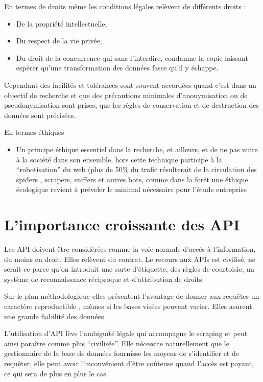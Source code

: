 \documentclass[
  letterpaper,
  DIV=11,
  numbers=noendperiod]{scrreprt}
\providecommand{\tightlist}{%
  \setlength{\itemsep}{0pt}\setlength{\parskip}{0pt}}\usepackage{longtable,booktabs,array}
\begin{document}
En termes de droits même les conditions légales relèvent de différents
droits :

\begin{itemize}
\tightlist
\item
  De la propriété intellectuelle,
\item
  Du respect de la vie privée,
\item
  Du droit de la concurrence qui sans l'interdire, condamne la copie
  laissant espérer qu'une transformation des données fasse qu'il y
  échappe.
\end{itemize}

Cependant des facilités et tolérances sont souvent accordées quand c'est
dans un objectif de recherche et que des précautions minimales
d'anonymisation ou de pseudonymisation sont prises, que les règles de
conservation et de destruction des données sont précisées.

En termes éthiques

\begin{itemize}
\tightlist
\item
  Un principe éthique essentiel dans la recherche, et ailleurs, et de ne
  pas nuire à la société dans son ensemble, hors cette technique
  participe à la ``robotisation'' du web (plus de 50\% du trafic
  résulterait de la circulation des spiders , scrapers, sniffers et
  autres bots, comme dans la forêt une éthique écologique revient à
  préveler le minimal nécessaire pour l'étude entreprise
\end{itemize}

\section{L'importance croissante des
API}\label{limportance-croissante-des-api}

Les API doivent être considérées comme la voie normale d'accès à
l'information, du moins en droit. Elles relèvent du contrat. Le recours
aux APIs est civilisé, ne serait-ce parce qu'on introduit une sorte
d'étiquette, des règles de courtoisie, un système de reconnaissance
réciproque et d'attribution de droits.

Sur le plan méthodologique elles présentent l'avantage de donner aux
requêtes un caractère reproductible , mêmes si les bases visées peuvent
varier. Elles asurent une grande fiabilité des données.

L'utilisation d'API lève l'ambiguïté légale qui accompagne le scraping
et peut ainsi paraître comme plus ``civilisée''. Elle nécessite
naturellement que le gestionnaire de la base de données fournisse les
moyens de s'identifier et de requêter, elle peut avoir l'inconvénient
d'être coûteuse quand l'accès est payant, ce qui sera de plus en plus le
cas.
\end{document}
